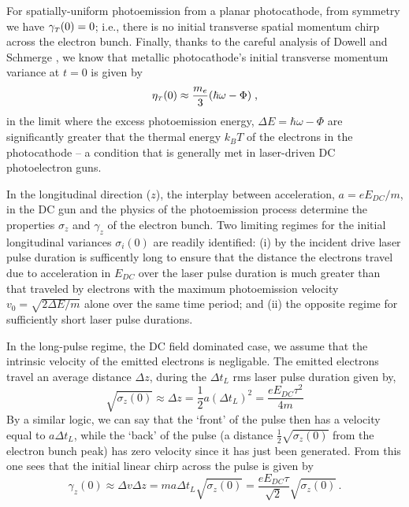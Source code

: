 For spatially-uniform photoemission from a planar photocathode, from symmetry we have $ \gamma_{{\scriptscriptstyle T}} ( 0 ) = 0 $; i.e., there is no initial transverse spatial momentum chirp across the electron bunch.
Finally, thanks to the careful analysis of Dowell and Schmerge \cite{dowell_quantum_2009}, we know that metallic photocathode's initial transverse momentum variance at $ t = 0 $ is given by
\begin{equation} \label{eq:jensen_eta}
  \eta_{ {\scriptscriptstyle T} } ( 0 ) \approx \frac{ m_{e} }{ 3 } ( \hbar \omega - \Phi ) \; \text{,}
\end{equation}
in the limit where the excess photoemission energy, $ \Delta E = \hbar \omega - \Phi $ are significantly greater that the thermal energy $ k_{B} T $ of the electrons in the photocathode -- a condition that is generally met in laser-driven DC photoelectron guns.

In the longitudinal direction ($z$), the interplay between acceleration, $ a = e E_{DC}/m $, in the DC gun and the physics of the photoemission process determine the properties $\sigma_z$ and $\gamma_z$ of the electron bunch.
Two limiting regimes for the initial longitudinal variances $ \sigma_{i} ( 0 ) $ are readily identified: (i) by the incident drive laser pulse duration is sufficently long to ensure that the distance the electrons travel due to acceleration in $ E_{DC} $ over the laser pulse duration is much greater than that traveled by electrons with the maximum photoemission velocity $ v_{0} = \sqrt{ 2 \Delta E / m } $ alone over the same time period; and (ii) the opposite regime for sufficiently short laser pulse durations.

In the long-pulse regime, the DC field dominated case, we assume that the intrinsic velocity of the emitted electrons is negligable.
The emitted electrons travel an average distance $ \Delta z $, during the $ \Delta t_{ L } $ rms laser pulse duration given by,
\begin{equation}
  \sqrt{ \sigma_{ z } ( 0 ) } \approx \Delta z = \frac{ 1 }{ 2 } a ( \Delta t_{L} )^{ 2 }  = \frac{ e E_{ DC } \tau^{ 2 } }{ 4 m }
\end{equation}
By a similar logic, we can say that the `front' of the pulse then has a velocity equal to $ a \Delta t_{ L } $, while the `back' of the pulse (a distance $ \frac{ 1 }{ 2 } \sqrt{ \sigma_{ z } ( 0 ) } $ from the electron bunch peak) has zero velocity since it has just been generated. From this one sees that the initial linear chirp across the pulse is given by 
\begin{equation}
  \gamma_{ z } ( 0 ) \approx \Delta v \Delta z = m a \Delta t_{ L } \sqrt{ \sigma_{ z } ( 0 ) } = \frac{ e E_{ DC } \tau }{ \sqrt{ 2 } }\sqrt{ \sigma_{ z } ( 0 ) }\, .
\end{equation} 

